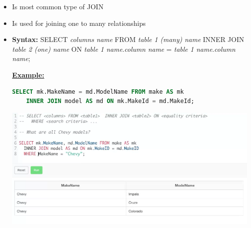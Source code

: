 \documentclass[12pt]{article}
\begin{document}
\begin{itemize}
    \item Is most common type of JOIN
    \item Is used for joining one to many relationships
    \item \textbf{Syntax:} SELECT \textit{columns name} FROM \textit{table 1 (many) name}
    INNER JOIN \textit{table 2 (one) name} ON \textit{table 1 name}.\textit{column name} = \textit{table 1 name}.\textit{column name};

    \bigskip

    \underline{\textbf{Example:}}

    \bigskip

    \begin{lstlisting}[language=SQL]
    SELECT mk.MakeName = md.ModelName FROM make AS mk
    INNER JOIN model AS md ON mk.MakeId = md.MakeId;
    \end{lstlisting}

    \bigskip

    \begin{center}
    \includegraphics[width=0.8\linewidth]{images/part_4_notes_2.png}
    \end{center}
\end{itemize}
\end{document}
